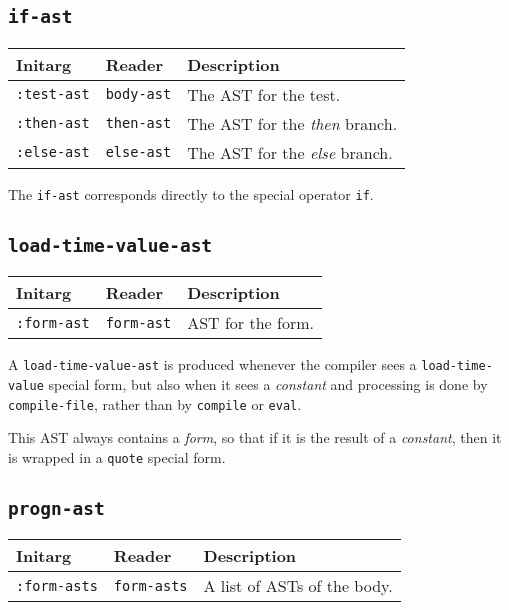 \subsection{\texttt{if-ast}}
\label{if-ast}

\begin{tabular}{|l|l|l|}
\hline
Initarg & Reader & Description\\
\hline\hline
\texttt{:test-ast} & \texttt{body-ast} & The AST for the test.\\
\hline
\texttt{:then-ast} & \texttt{then-ast} & The AST for the \emph{then} branch.\\
\hline
\texttt{:else-ast} & \texttt{else-ast} & The AST for the \emph{else} branch.\\
\hline
\end{tabular}

The \texttt{if-ast} corresponds directly to the \cl{} special operator
\texttt{if}. 

\subsection{\texttt{load-time-value-ast}}
\label{load-time-value-ast}

\begin{tabular}{|l|l|l|}
\hline
Initarg & Reader & Description\\
\hline\hline
\texttt{:form-ast} & \texttt{form-ast} & AST for the form.\\
\hline
\end{tabular}

A \texttt{load-time-value-ast} is produced whenever the compiler sees
a \texttt{load-time-value} special form, but also when it sees a
\emph{constant} and processing is done by \texttt{compile-file},
rather than by \texttt{compile} or \texttt{eval}.  

This AST always contains a \emph{form}, so that if it is the result of
a \emph{constant}, then it is wrapped in a \texttt{quote} special
form. 

\subsection{\texttt{progn-ast}}
\label{progn-ast}

\begin{tabular}{|l|l|l|}
\hline
Initarg & Reader & Description\\
\hline\hline
\texttt{:form-asts} & \texttt{form-asts} & A list of ASTs of the body.\\
\hline
\end{tabular}

